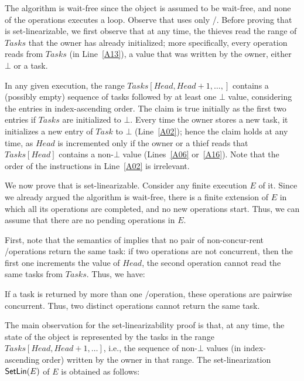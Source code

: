\begin{proofT}
The algorithm is wait-free since the \MaxReg object is assumed to be wait-free, and none of the operations executes a loop. Observe that \Put uses only \R/\W. Before proving that \WFWSM is set-linearizable, we first observe that at any time, the thieves read the range of \(Tasks\) that the owner has already initialized; more specifically, every \Steal operation reads from \(Tasks\) (in Line~\ref{A13}), a value that was written by the owner, either \(\bot\) or a task.

In any given execution, the range \(Tasks[Head, Head+1, \hdots, ]\) contains a (possibly empty) sequence of tasks followed by at least one \(\bot\) value, considering the entries in index-ascending order. The claim is true initially as the first two entries if \(Tasks\) are initialized to \(\bot\). Every time the owner stores a new task, it initializes a new entry of \(Task\) to \(\bot\) (Line~\ref{A02}); hence the claim holds at any time, as \(Head\) is incremented only if the owner or a thief reads that \(Tasks[Head]\) contains a non-\(\bot\) value (Lines~\ref{A06} or~\ref{A16}).  Note that the order of the instructions in Line~\ref{A02} is irrelevant.

We now prove that \WFWSM is set-linearizable. Consider any finite execution \(E\) of it. Since we already argued the algorithm is wait-free, there is a finite extension of \(E\) in which all its operations are completed, and no new operations start. Thus, we can assume that there are no pending operations in \(E\).

First, note that the semantics of \MaxW implies that no pair of non-concur-rent \Take/\Steal operations return the same task: if two operations are not concurrent, then the first one increments the value of \(Head\), the second operation cannot read the same tasks from \(Tasks\). Thus, we have:

\begin{remark}\label{remark-concurrency}
If a task is returned by more than one \Take/\Steal operation, these operations are pairwise concurrent. Thus, two distinct \Take operations cannot return the same task.
\end{remark}


The main observation for the set-linearizability proof is that, at any time, the state of the object is represented by the tasks in the range \(Tasks[Head, Head+1, \hdots ]\), i.e., the sequence of non-\(\bot\) values (in index-ascending order) written by the owner in that range. The set-linearization \({\sf SetLin}(E)\) of \(E\) is obtained as follows:


\end{proofT}
